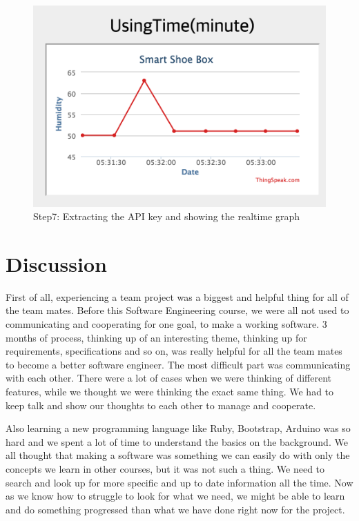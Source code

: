 \documentclass[conference]{IEEEtran}
\begin{document}
\begin{figure}[H]
\begin{center}
    \includegraphics[scale=0.45]{usingtime}
    \caption{Step7: Extracting the API key and showing the realtime graph} \label{fig:label}
\end{center}
\end{figure}
\section{Discussion}
First of all, experiencing a team project was a biggest and helpful thing for all of the team mates. Before this Software Engineering course, we were all not used to communicating and cooperating for one goal, to make a working software. 3 months of process, thinking up of an interesting theme, thinking up for requirements, specifications and so on, was really helpful for all the team mates to become a better software engineer. The most difficult part was communicating with each other. There were a lot of cases when we were thinking of different features, while we thought we were thinking the exact same thing. We had to keep talk and show our thoughts to each other to manage and cooperate.

 Also learning a new programming language like Ruby, Bootstrap, Arduino was so hard and we spent a lot of time to understand the basics on the background. We all thought that making a software was something we can easily do with only the concepts we learn in other courses, but it was not such a thing. We need to search and look up for more specific and up to date information all the time. Now as we know how to struggle to look for what we need, we might be able to learn and do something progressed than what we have done right now for the project.
 
\end{document}
